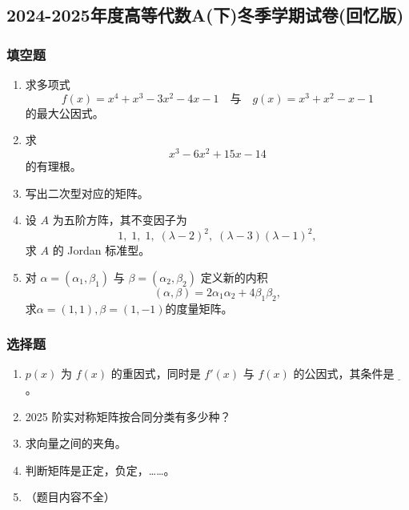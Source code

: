 \subsection{2024-2025年度高等代数A(下)冬季学期试卷(回忆版)}

\subsubsection*{填空题}

\begin{enumerate}
    \item 求多项式
    \begin{equation*}
    f(x)=x^{4}+x^{3}-3x^{2}-4x-1 \quad \text{与} \quad g(x)=x^{3}+x^{2}-x-1
    \end{equation*}
    的最大公因式。

    \item 求
    \begin{equation*}
    x^{3}-6x^{2}+15x-14
    \end{equation*}
    的有理根。

    \item 写出二次型对应的矩阵。

    \item 设 \(A\) 为五阶方阵，其不变因子为
    \begin{equation*}
    1,\;1,\;1,\;(\lambda-2)^{2},\;(\lambda-3)(\lambda-1)^{2},
    \end{equation*}
    求 \(A\) 的 Jordan 标准型。

    \item 对 \(\alpha=(\alpha_{1},\beta_{1})\) 与 \(\beta=(\alpha_{2},\beta_{2})\) 定义新的内积
    \begin{equation*}
    (\alpha,\beta)=2\alpha_{1}\alpha_{2}+4\beta_{1}\beta_{2},
    \end{equation*}
    求\(\alpha=(1,1),\beta=(1,-1)\)的度量矩阵。
\end{enumerate}

\subsubsection*{选择题}

\begin{enumerate}
    \item \(p(x)\) 为 \(f(x)\) 的重因式，同时是 \(f'(x)\) 与 \(f(x)\) 的公因式，其条件是 $\underline{}$。
    
    \item 2025 阶实对称矩阵按合同分类有多少种？

    \item 求向量之间的夹角。

    \item 判断矩阵是正定，负定，……。

    \item （题目内容不全）
\end{enumerate}

